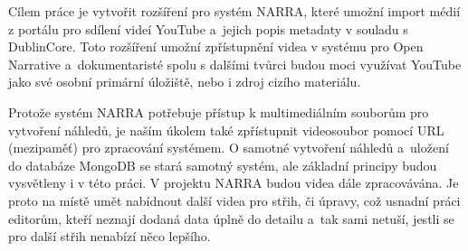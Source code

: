 \par Cílem práce je vytvořit rozšíření pro systém NARRA, které umožní import médií z portálu pro sdílení videí YouTube a~jejich popis metadaty v souladu s DublinCore. Toto rozšíření umožní zpřístupnění videa v systému pro Open Narrative a~dokumentaristé spolu s dalšími tvůrci budou moci využívat YouTube jako své osobní primární úložiště, nebo i zdroj cizího materiálu.
\par Protože systém NARRA potřebuje přístup k multimediálním souborům pro vytvoření náhledů, je naším úkolem také zpřístupnit videosoubor pomocí URL (mezipaměť) pro zpracování systémem. O samotné vytvoření náhledů a~uložení do databáze MongoDB se stará samotný systém, ale základní principy budou vysvětleny i v této práci. V projektu NARRA budou videa dále zpracovávána. Je proto na místě umět nabídnout další videa pro střih, či úpravy, což usnadní práci editorům, kteří neznají dodaná data úplně do detailu a~tak sami netuší, jestli se pro další střih nenabízí něco lepšího.